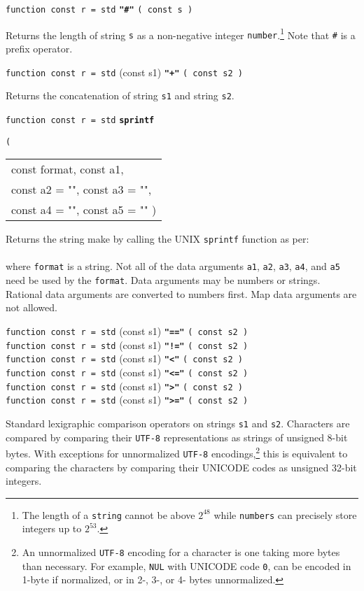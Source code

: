 \documentclass[12pt]{article}
\newcommand{\ttkey}[1]{{\tt \bfseries #1}}
\newenvironment{indpar}[1][0.3in]%
	{\begin{list}{}%
		     {\setlength{\itemsep}{0in}%
		      \setlength{\topsep}{0in}%
		      \setlength{\parsep}{1ex}%
		      \setlength{\labelwidth}{#1}%
		      \setlength{\leftmargin}{#1}%
		      \addtolength{\leftmargin}{\labelsep}}%
	 \item}%
	{\end{list}}
\begin{document}
{\tt function const r = std} \ttkey{"\#"} {\tt ( const s )}
\begin{indpar}
Returns the length of string {\tt s} as a non-negative integer
{\tt number}.\footnote{The length of a {\tt string} cannot
be above $2^{48}$ while
{\tt numbers} can precisely store integers up to $2^{53}$.}
Note that {\tt \#} is a prefix operator.
\end{indpar}

{\tt function const r = std} (const s1) \ttkey{"+"} {\tt ( const s2 )}
\begin{indpar}
Returns the concatenation of string {\tt s1}
and string {\tt s2}.
\end{indpar}

{\tt function const r = std} \ttkey{sprintf}
    {\tt ( \begin{tabular}[t]{@{}l}
            const format, const a1, \\
	    const a2 = "", const a3 = "", \\
	    const a4 = "", const a5 = "" )
	    \end{tabular} }
\begin{indpar}
Returns the string make by calling the UNIX {\tt sprintf} function as per: \\
\hspace*{1in}{\tt sprintf ( format, a1, a2, a3, a4, a5 )} \\
where {\tt format} is a string.  Not all of the data arguments
{\tt a1}, {\tt a2}, {\tt a3}, {\tt a4}, and {\tt a5}
need be used by the {\tt format}.
Data arguments may be numbers or strings.
Rational data arguments are converted to numbers first.  Map data arguments
are not allowed.
\end{indpar}

{\tt function const r = std} (const s1) \ttkey{"=="} {\tt ( const s2 )} \\
{\tt function const r = std} (const s1) \ttkey{"!="} {\tt ( const s2 )} \\
{\tt function const r = std} (const s1) \ttkey{"<"} {\tt ( const s2 )} \\
{\tt function const r = std} (const s1) \ttkey{"<="} {\tt ( const s2 )} \\
{\tt function const r = std} (const s1) \ttkey{">"} {\tt ( const s2 )} \\
{\tt function const r = std} (const s1) \ttkey{">="} {\tt ( const s2 )}
\begin{indpar}
Standard lexigraphic comparison operators on strings {\tt s1} and {\tt s2}.
Characters are compared by comparing their {\tt UTF-8} representations
as strings of unsigned 8-bit bytes.  With exceptions for unnormalized
{\tt UTF-8} encodings,\footnote{
An unnormalized {\tt UTF-8} encoding for a character is one taking
more bytes than necessary.  For example, {\tt NUL} with UNICODE code {\tt 0},
can be encoded in 1-byte if normalized, or in 2-, 3-, or 4- bytes
unnormalized.}
this is equivalent to comparing the characters
by comparing their UNICODE codes as unsigned 32-bit integers.
\end{indpar}
\end{document}
